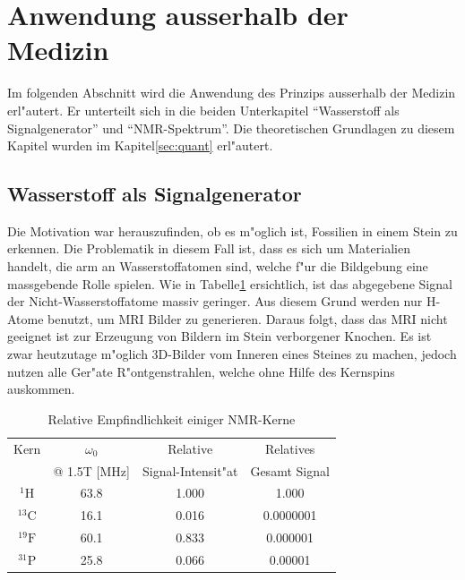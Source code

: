 \section{Anwendung ausserhalb der Medizin \label{chapter:MRI:bsp}}

Im folgenden Abschnitt wird die Anwendung des Prinzips ausserhalb der Medizin erl"autert. Er unterteilt sich in die beiden Unterkapitel "`Wasserstoff als Signalgenerator"' und "`NMR-Spektrum"'. Die theoretischen Grundlagen zu diesem Kapitel wurden im Kapitel\;\ref{sec:quant} erl"autert.

\subsection{Wasserstoff als Signalgenerator}
Die Motivation war herauszufinden, ob es m"oglich ist, Fossilien in einem Stein zu erkennen. Die Problematik in diesem Fall ist, dass es sich um Materialien handelt, die arm an Wasserstoffatomen sind, welche f"ur die Bildgebung eine massgebende Rolle spielen. Wie in Tabelle\;\ref{mri:bsp:tab:NMR_Kerne} ersichtlich, ist das abgegebene Signal der Nicht-Wasserstoffatome massiv geringer. Aus diesem Grund werden nur H-Atome benutzt, um MRI Bilder zu generieren. Daraus folgt, dass das MRI nicht geeignet ist zur Erzeugung von Bildern im Stein verborgener Knochen. Es ist zwar heutzutage m"oglich 3D-Bilder vom Inneren eines Steines zu machen, jedoch nutzen alle Ger"ate R"ontgenstrahlen, welche ohne Hilfe des Kernspins auskommen.
\begin{table}
	\centering
	\begin{tabular}{|c|c|c|c|}
		\hline
		Kern 				& $\omega_0$ 	& Relative 				& Relatives\\
							& @ 1.5T [MHz] 	& Signal-Intensit"at 	& Gesamt Signal\\
		\hline
		$\mathrm{^{1}H}$ 	& 63.8 			& 1.000 				& 1.000 \\
		$\mathrm{^{13}C}$ 	& 16.1 			& 0.016 				& 0.0000001 \\
		$\mathrm{^{19}F}$ 	& 60.1 			& 0.833 				& 0.000001 \\
		$\mathrm{^{31}P}$ 	& 25.8 			& 0.066 				& 0.00001 \\
		\hline
	\end{tabular}
	\caption{Relative Empfindlichkeit einiger NMR-Kerne \cite{skript:mri:AMSM_Paper}}
	\label{mri:bsp:tab:NMR_Kerne}
\end{table}
